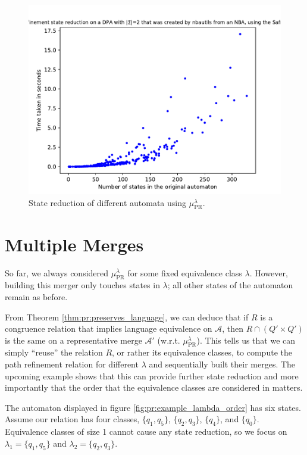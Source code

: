 \begin{figure}
	\centering
	\includegraphics[page=1,height=.4\textheight]{../data/analysis/path_refinement/detnbaut_safra_ap1.pdf} 
	\caption{State reduction of different automata using $\mu_\text{PR}^\lambda$.}
	\label{fig:pr:empirical_safra_time}
\end{figure}




\section{Multiple Merges}
So far, we always considered $\mu_\text{PR}^\lambda$ for some fixed equivalence class $\lambda$. However, building this merger only touches states in $\lambda$; all other states of the automaton remain as before. 

From Theorem \ref{thm:pr:preserves_language}, we can deduce that if $R$ is a congruence relation that implies language equivalence on $\mathcal{A}$, then $R \cap (Q' \times Q')$ is the same on a representative merge $\mathcal{A}'$ (w.r.t. $\mu_\text{PR}^\lambda$). This tells us that we can simply \enquote{reuse} the relation $R$, or rather its equivalence classes, to compute the path refinement relation for different $\lambda$ and sequentially built their merges. The upcoming example shows that this can provide further state reduction and more importantly that the order that the equivalence classes are considered in matters.

The automaton displayed in figure \ref{fig:pr:example_lambda_order} has six states. Assume our relation has four classes, $\{q_1, q_5\}$, $\{q_2, q_3\}$, $\{q_4\}$, and $\{q_0\}$. Equivalence classes of size 1 cannot cause any state reduction, so we focus on $\lambda_1 = \{q_1, q_5\}$ and $\lambda_2 = \{q_2, q_3\}$.

